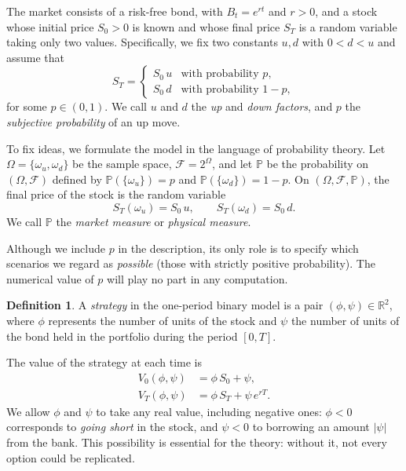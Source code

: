 \documentclass[11pt,a4paper,oneside]{report}
\theoremstyle{plain}
\theoremstyle{definition}
\newtheorem{definicion}[teorema]{Definition}
\theoremstyle{remark}
\newcommand{\R}{\mathbb{R}}
\newcommand{\PP}{\mathbb{P}}
\newcommand{\F}{\mathcal{F}}
\newcommand{\1}{\mathbf{1}}
\begin{document}
The market consists of a
risk-free bond, with $B_t = e^{rt}$ and $r > 0$, and a stock whose
initial price $S_0 > 0$ is known and whose final price $S_T$ is a
random variable taking only two values. Specifically, we fix two
constants $u, d$ with $0 < d < u$ and assume that
\begin{equation*}
  S_T = \begin{cases}
    S_0\, u & \text{with probability } p, \\[2pt]
    S_0\, d & \text{with probability } 1 - p,
  \end{cases}
\end{equation*}
for some $p \in (0, 1)$. We call $u$ and $d$ the \emph{up} and
\emph{down factors}, and $p$ the \emph{subjective probability} of an
up move.

To fix ideas, we formulate the model in the language of probability
theory. Let $\Omega = \{\omega_u, \omega_d\}$ be the sample space,
$\F = 2^{\Omega}$, and let $\PP$ be the probability on $(\Omega, \F)$
defined by $\PP(\{\omega_u\}) = p$ and $\PP(\{\omega_d\}) = 1 - p$. On
$(\Omega, \F, \PP)$, the final price of the stock is the random
variable
\begin{equation*}
  S_T(\omega_u) = S_0\, u, \qquad S_T(\omega_d) = S_0\, d.
\end{equation*}
We call $\PP$ the \emph{market measure} or \emph{physical measure}.

Although we include $p$ in the description, its only role is to
specify which scenarios we regard as \emph{possible} (those with
strictly positive probability). The numerical value of $p$ will play
no part in any computation.

\begin{definicion}
A \emph{strategy} in the one-period binary model is a pair
$(\phi, \psi) \in \R^2$, where $\phi$ represents the number of units of
the stock and $\psi$ the number of units of the bond held in the
portfolio during the period $[0, T]$.
\end{definicion}

The value of the strategy at each time is
\begin{align*}
  V_0(\phi, \psi)   &= \phi\, S_0 + \psi, \\
  V_T(\phi, \psi)   &= \phi\, S_T + \psi\, e^{rT}.
\end{align*}
We allow $\phi$ and $\psi$ to take any real value, including negative
ones: $\phi < 0$ corresponds to \emph{going short} in the stock, and
$\psi < 0$ to borrowing an amount $|\psi|$ from the bank. This
possibility is essential for the theory: without it, not every option
could be replicated.
\end{document}
